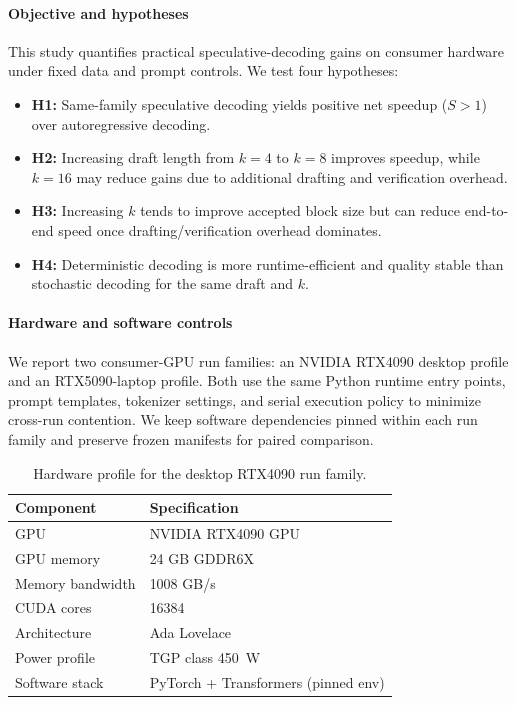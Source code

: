 \paragraph{Objective and hypotheses}
This study quantifies practical speculative-decoding gains on consumer hardware
under fixed data and prompt controls.
We test four hypotheses:
\begin{itemize}
    \item \textbf{H1:} Same-family speculative decoding yields positive net speedup
        ($S>1$) over autoregressive decoding.
    \item \textbf{H2:} Increasing draft length from $k{=}4$ to $k{=}8$ improves
        speedup, while $k{=}16$ may reduce gains due to additional drafting
        and verification overhead.
    \item \textbf{H3:} Increasing $k$ tends to improve accepted block size but can
        reduce end-to-end speed once drafting/verification overhead dominates.
    \item \textbf{H4:} Deterministic decoding is more runtime-efficient and quality
        stable than stochastic decoding for the same draft and $k$.
\end{itemize}

\paragraph{Hardware and software controls}
We report two consumer-GPU run families:
an NVIDIA RTX4090 desktop profile and an RTX5090-laptop profile.
Both use the same Python runtime entry points, prompt templates,
tokenizer settings, and serial execution policy to minimize cross-run
contention. We keep software dependencies pinned within each run family and
preserve frozen manifests for paired comparison.

\begin{table}[t]
\centering
\caption{Hardware profile for the desktop RTX4090 run family.}
\label{tab:hw-profile}
\small
\begin{tabular}{ll}
\hline
\textbf{Component} & \textbf{Specification} \\
\hline
GPU & NVIDIA RTX4090 GPU \\
GPU memory & 24 GB GDDR6X \\
Memory bandwidth & 1008 GB/s \\
CUDA cores & 16384 \\
Architecture & Ada Lovelace \\
Power profile & TGP class 450~W \\
Software stack & PyTorch + Transformers (pinned env) \\
\hline
\end{tabular}
\end{table}

